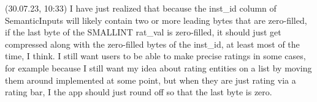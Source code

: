 \documentclass{report}
\begin{document}

(30.07.23, 10:33) I have just realized that because the inst\_id column of SemanticInputs will likely contain two or more leading bytes that are zero-filled, if the last byte of the SMALLINT rat\_val is zero-filled, it should just get compressed along with the zero-filled bytes of the inst\_id, at least most of the time, I think. I still want users to be able to make precise ratings in some cases, for example because I still want my idea about rating entities on a list by moving them around implemented at some point, but when they are just rating via a rating bar, I the app should just round off so that the last byte is zero.


\end{document}
